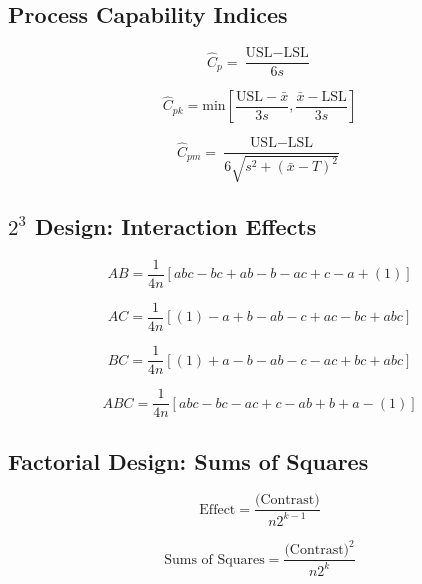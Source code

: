 \documentclass[a4paper,12pt]{article}
\begin{document}
\subsection*{Process Capability Indices}
\[ \hat{C}_p = \frac{\mbox{USL} - \mbox{LSL}}{6s}\]

\[ \hat{C}_{pk} = \mbox{min} \left[\frac{\mbox{USL} - \bar{x}}{3s},\frac{\bar{x} - \mbox{LSL}}{3s} \right] \]

\[ \hat{C}_{pm} = \frac{\mbox{USL} - \mbox{LSL}}{6\sqrt{s^2+(\bar{x}-T)^2}}\]
\bigskip
%
\subsection*{$2^3$ Design: Interaction Effects}

\[ AB = \frac{1}{4n} \left[ abc - bc + ab - b - ac + c - a + (1) \right] \]

\[ AC = \frac{1}{4n} \left[ (1) - a + b - ab -c + ac - bc + abc \right] \]

\[ BC = \frac{1}{4n} \left[ (1) + a - b - ab - c - ac + bc + abc \right] \]

\[ABC = \frac{1}{4n} \left[ abc - bc - ac + c - ab + b +  a - (1) \right] \]

\bigskip

\subsection*{Factorial Design: Sums of Squares}

\[\mbox{Effect} =  \frac{\mbox{(Contrast)}}{n2^{k-1}}\]

\[\mbox{Sums of Squares} =  \frac{\mbox{(Contrast)}^2}{n2^k}\]
\end{document}
